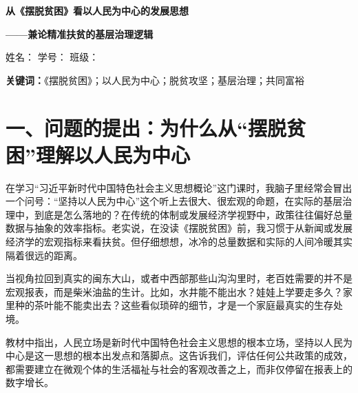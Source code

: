 \documentclass[12pt,a4paper]{ctexart}
\begin{document}
\begin{center}
    {\bfseries 从《摆脱贫困》看以人民为中心的发展思想\par}
    \vspace{0.5em}
    {\bfseries ——兼论精准扶贫的基层治理逻辑\par}
    \vspace{1.2em}
    {
    姓名：\underline{} \qquad
    学号：\underline{} \qquad
    班级：\underline{}\par}
    \vspace{1.0em}
\end{center}

\begin{abstract}
《摆脱贫困》记录闽东地区走出贫困的历程，是理解中国特色社会主义现代化基层治理的生动实践。它将宏大叙事与群众路线、干部作风建设、调查研究方法以及地方产业选择等内容融为一体。结合课程的相关教学内容，本文聚焦于“以人民为中心”的实践落地，分析《摆脱贫困》中的基层治理逻辑。
通过对脱贫攻坚实践的分析，本文认为：中国脱贫成就的密码，并不在于单纯的行政资源投入，而在于建立了一套响应群众真实需求、广泛动员群众参与、良性互动的制度化和系统化的治理机制。
\end{abstract}

\noindent \textbf{关键词：}《摆脱贫困》；以人民为中心；脱贫攻坚；基层治理；共同富裕

\vspace{1.5em}

\section*{一、问题的提出：为什么从“摆脱贫困”理解以人民为中心}

在学习“习近平新时代中国特色社会主义思想概论”这门课时，我脑子里经常会冒出一个问号：“坚持以人民为中心”这个听上去很大、很宏观的命题，在实际的基层治理中，到底是怎么落地的？在传统的体制或发展经济学视野中，政策往往偏好总量数据与抽象的效率指标。老实说，在没读《摆脱贫困》前，我习惯于从新闻或发展经济学的宏观指标来看扶贫。但仔细想想，冰冷的总量数据和实际的人间冷暖其实隔着很远的距离。

当视角拉回到真实的闽东大山，或者中西部那些山沟沟里时，老百姓需要的并不是宏观报表，而是柴米油盐的生计。比如，水井能不能出水？娃娃上学要走多久？家里种的茶叶能不能卖出去？这些看似琐碎的细节，才是一个家庭最真实的生存处境。

教材中指出，人民立场是新时代中国特色社会主义思想的根本立场，坚持以人民为中心是这一思想的根本出发点和落脚点。这告诉我们，评估任何公共政策的成效，都需要建立在微观个体的生活福祉与社会的客观改善之上，而非仅停留在报表上的数字增长。
\end{document}
